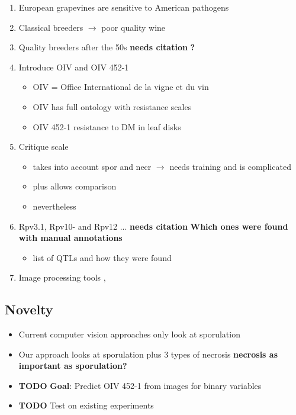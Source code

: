 \documentclass[english]{article}
\begin{document}
\begin{enumerate}
	\item European grapevines are sensitive to American pathogens~\parencite{fontaineEuropeBridgeheadWorldwide2021}
	\item Classical breeders $\rightarrow$ poor quality wine
	\item Quality breeders after the 50s \textbf{needs citation} \textbf{?}
	\item Introduce OIV and OIV 452-1
	      \begin{itemize}
		      \item OIV = Office International de la vigne et du vin
		      \item OIV has full ontology with resistance scales
		      \item OIV 452-1 resistance to DM in leaf disks
	      \end{itemize}
	\item Critique scale \parencite{possamaiPhenotypingQTLIdentification2022}
	      \begin{itemize}
		      \item takes into account spor and necr $\rightarrow$ needs training and is complicated
		      \item plus allows comparison
		      \item nevertheless \parencite{possamaiPhenotypingQTLIdentification2022}
	      \end{itemize}
	\item Rpv3.1, Rpv10- and Rpv12 ... \textbf{needs citation} \textbf{Which ones were found with manual annotations}
	      \begin{itemize}
		      \item  \parencite{possamaiPhenotypingQTLIdentification2022} list of QTLs and how they were found
	      \end{itemize}
	\item Image processing tools \parencite{hernandezAssessmentDownyMildew2022}, \parencite{zendlerHighthroughputPhenotypingLeaf2021}
\end{enumerate}

\subsection{Novelty}

\begin{itemize}
	\item Current computer vision approaches only look at sporulation
	\item Our approach looks at sporulation plus 3 types of necrosis \textbf{necrosis as important as sporulation?}
	\item \textbf{TODO} \textbf{Goal}: Predict OIV 452-1 from images for binary variables
	\item \textbf{TODO} Test on existing experiments
\end{itemize}
\end{document}

